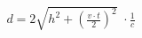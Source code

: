 \documentclass[preview]{standalone}
\begin{document}
\begin{align*}
d=2 \sqrt{h^2+( \frac{v \cdot t}{2})^2}\,\,\cdot {\frac{1}{c}}
\end{align*}
\end{document}
